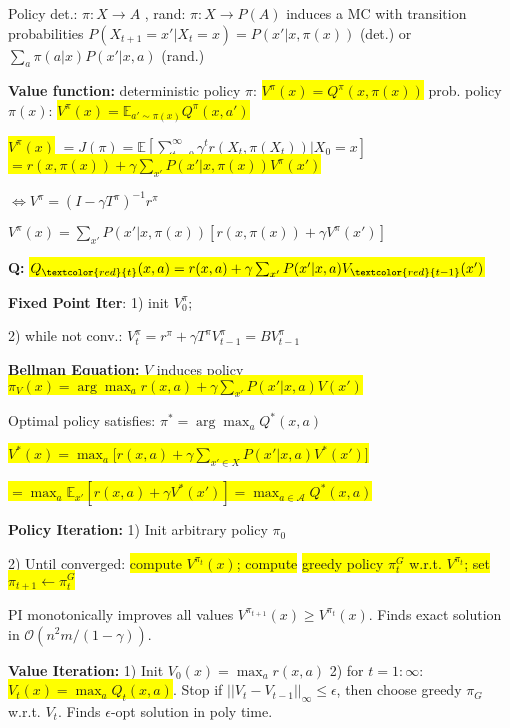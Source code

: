 \documentclass[11pt,landscape,a4paper,fleqn]{article}
\newcommand{\mhl}[1]{\setlength{\fboxsep}{0pt}\colorbox{yellow}{#1}}
\begin{document}
\begin{multicols*}{4}
		Policy det.: $\pi: X \rightarrow A$ , rand: $\pi: X \rightarrow P(A)$
		induces a MC with transition probabilities
	$P(X_{t+1} = x' | X_t = x) = P(x' | x, \pi(x))$ (det.)
		or $\sum_a \pi(a | x) P(x' | x, a)$ (rand.)

		\textbf{Value function:}
		deterministic policy $\pi$: \mhl{$V^\pi(x) = Q^\pi(x, \pi(x))$}
		prob. policy $\pi(x)$: \mhl{$V^\pi(x) = \mathbb{E}_{a' \sim \pi(x)} Q^\pi(x,a')$}

		\mhl{$V^\pi(x)$} $ = J(\pi) = \mathbb{E}[\sum_{t=0}^{\infty} \gamma^t r(X_t, \pi(X_t)) | X_0 = x]$
		\mhl{$ = r(x, \pi(x)) + \gamma \sum_{x'} P(x' | x, \pi(x)) V^\pi(x')$}

		\qquad $\Leftrightarrow V^\pi = (I - \gamma T^\pi)^{-1} r^\pi$


		\mbox{$V^\pi(x) = \sum_{x'} P(x' | x, \pi(x)) [r(x,\pi(x)) + \gamma V^\pi(x')]$}

		\textbf{Q:} \mhl{$Q_{\textcolor{red}{t}}(x,a) = r(x,a) + \gamma \sum_{x'} P(x' | x,a) V_{\textcolor{red}{t-1}}(x')$}

		\textbf{Fixed Point Iter}:
		1) init $V_0^\pi$;

		2) while not conv.: $V_t^\pi = r^\pi + \gamma T^\pi V_{t-1}^\pi = BV^\pi_{t-1}$

		\textbf{Bellman Equation:}
	$V$ induces policy\\
		\mhl{$\pi_V(x) = \arg\max_a r(x,a) + \gamma \sum_{x'} P(x' | x,a) V(x')$}

		Optimal policy satisfies:
	$\pi^* = \arg\max_a Q^*(x,a)$

		\mhl{$V^*(x) = \max_{a } \big[ r(x,a) + \gamma \sum_{x' \in X} P(x' | x,a) V^*(x') \big]$}

		\mhl{$ = \max_{a} \mathbb{E}_{x'}[r(x,a) + \gamma V^*(x')] = \max_{a \in \mathcal{A}} Q^*(x,a)$}

		\textbf{Policy Iteration:} 1) Init arbitrary policy $\pi_0$

		2) Until converged: \mhl{compute $V^{\pi_t}(x)$; compute}
		\mhl{greedy policy $\pi_t^G$ w.r.t. $V^{\pi_t}$; set $\pi_{t+1} \leftarrow \pi_t^G$}

		PI monotonically improves all values $V^{\pi_{t+1}}(x) \geq V^{\pi_{t}}(x)$.
		Finds exact solution in $\mathcal{O}(n^2 m / (1-\gamma))$.


		\textbf{Value Iteration:}
		1) Init $V_0(x) = \max_a r(x,a)$ 2) for $t = 1:\infty$: \mhl{$V_t(x) = \max_a Q_t(x,a)$}.
		Stop if $||V_t - V_{t-1}||_\infty \leq \epsilon$, then choose greedy $\pi_G$ w.r.t. $V_t$. Finds $\epsilon$-opt solution in poly time.



\end{multicols*}
\end{document}
